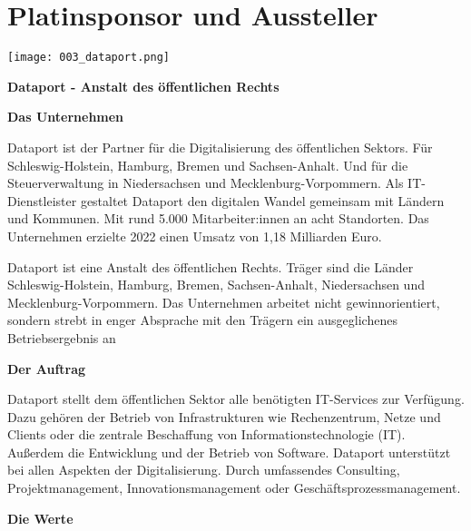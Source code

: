 \section*{Platinsponsor und Aussteller}
  \texttt{[image: 003\_dataport.png]}
  \vspace{1.0\baselineskip}
  
\noindent
    {\bfseries Dataport - Anstalt des öffentlichen Rechts}
    
\noindent
    {\bfseries Das Unternehmen}
    
\noindent    
Dataport ist der Partner für die Digitalisierung des öffentlichen Sektors. Für Schleswig-Holstein, Hamburg, Bremen und Sachsen-Anhalt. Und für die Steuerverwaltung in Niedersachsen und Mecklenburg-Vorpommern. Als IT-Dienstleister gestaltet Dataport den digitalen Wandel gemeinsam mit Ländern und Kommunen. Mit rund 5.000 Mitarbeiter:innen an acht Standorten. Das Unternehmen erzielte 2022 einen Umsatz von 1,18 Milliarden Euro.

\noindent    
Dataport ist eine Anstalt des öffentlichen Rechts. Träger sind die Länder Schleswig-Holstein, Hamburg, Bremen, Sachsen-Anhalt, Niedersachsen und Mecklenburg-Vorpommern. Das Unternehmen arbeitet nicht gewinnorientiert, sondern strebt in enger Absprache mit den Trägern ein ausgeglichenes Betriebsergebnis an

\noindent
{\bfseries Der Auftrag}

\noindent
Dataport stellt dem öffentlichen Sektor alle benötigten IT-Services zur Verfügung. Dazu gehören der Betrieb von Infrastrukturen wie Rechenzentrum, Netze und Clients oder die zentrale Beschaffung von Informationstechnologie (IT). Außerdem die Entwicklung und der Betrieb von Software. Dataport unterstützt bei allen Aspekten der Digitalisierung. Durch umfassendes Consulting, Projektmanagement, Innovationsmanagement oder Geschäftsprozessmanagement.

\noindent
{\bfseries Die Werte}

